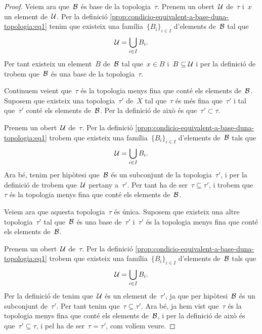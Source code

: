 \documentclass[../../main.tex]{subfiles}
\begin{document}
\begin{proof}
        Veiem ara que~\(\mathcal{B}\) és base de la topologia~\(\tau\).
        Prenem un obert~\(\mathcal{U}\) de~\(\tau\) i~\(x\) un element de~\(\mathcal{U}\).
        Per la definició \eqref{prop:condicio-equivalent-a-base-duna-topologia:eq1} tenim que existeix una família~\(\{B_{i}\}_{i\in I}\) d'elements de~\(\mathcal{B}\) tal que
        \[
            \mathcal{U}=\bigcup_{i\in I}B_{i}.
        \]
        Per tant existeix un element~\(B\) de~\(\mathcal{B}\) tal que~\(x\in B\) i~\(B\subseteq\mathcal{U}\) i per la definició de  trobem que~\(\mathcal{B}\) és una base de la topologia~\(\tau\).

        Continuem veient que~\(\tau\) és la topologia menys fina que conté els elements de~\(\mathcal{B}\).
        Suposem que existeix una topologia~\(\tau'\) de~\(X\) tal que~\(\tau\) és més fina que~\(\tau'\) i tal que~\(\tau'\) conté els elements de~\(\mathcal{B}\).
        Per la definició de  això és que~\(\tau'\subset\tau\).

        Prenem un obert~\(\mathcal{U}\) de~\(\tau\).
        Per la definició \eqref{prop:condicio-equivalent-a-base-duna-topologia:eq1} trobem que existeix una família~\(\{B_{i}\}_{i\in I}\) d'elements de~\(\mathcal{B}\) tals que
        \[
            \mathcal{U}=\bigcup_{i\in I}B_{i}.
        \]
        Ara bé, tenim per hipòtesi que~\(\mathcal{B}\) és un subconjunt de la topologia~\(\tau'\), i per la definició de  trobem que~\(\mathcal{U}\) pertany a~\(\tau'\).
        Per tant ha de ser~\(\tau\subseteq\tau'\), i trobem que~\(\tau\) és la topologia menys fina que conté els elements de~\(\mathcal{B}\).

        Veiem ara que aquesta topologia~\(\tau\) és única.
        Suposem que existeix una altre topologia~\(\tau'\) tal que~\(\mathcal{B}\) és una base de~\(\tau'\) i~\(\tau'\) és la topologia menys fina que conté els elements de~\(\mathcal{B}\).

        Prenem un obert~\(\mathcal{U}\) de~\(\tau\).
        Per la definició \eqref{prop:condicio-equivalent-a-base-duna-topologia:eq1} trobem que existeix una família~\(\{B_{i}\}_{i\in I}\) d'elements de~\(\mathcal{B}\) tals que
        \[
            \mathcal{U}=\bigcup_{i\in I}B_{i}.
        \]
        Per la definició de  tenim que~\(\mathcal{U}\) és un element de~\(\tau'\), ja que per hipòtesi~\(\mathcal{B}\) és un subconjunt de~\(\tau'\).
        Per tant tenim que~\(\tau\subseteq\tau'\).
        Ara bé, ja hem vist que~\(\tau\) és la topologia menys fina que conté els elements de~\(\mathcal{B}\), i per la definició de  això és que~\(\tau'\subseteq\tau\), i pel  ha de ser~\(\tau=\tau'\), com volíem veure.
    \end{proof}
\end{document}
